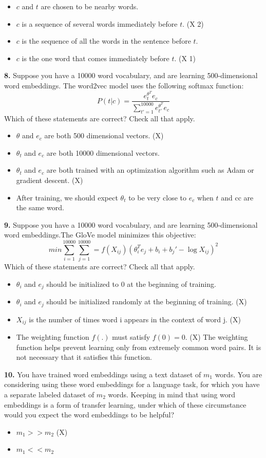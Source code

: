 \begin{itemize}
    \item $c$ and $t$ are chosen to be nearby words.
    \item $c$ is a sequence of several words immediately before $t$. (X 2)
    \item $c$ is the sequence of all the words in the sentence before $t$.
    \item $c$ is the one word that comes immediately before $t$. (X 1)
\end{itemize}
\textbf{8.} Suppose you have a 10000 word vocabulary, and are learning 500-dimensional word embeddings. The word2vec model uses the following softmax function:
\begin{equation*}
     P(t | c) = \frac{e^{\theta^T}_t e_c}{\sum^{10000}_{t'=1} e^{\theta^T}_{t'} e_c}
\end{equation*}
Which of these statements are correct? Check all that apply.
\begin{itemize}
    \item $\theta$ and $e_c$ are both 500 dimensional vectors. (X)
    \item $\theta_t$ and $e_c$ are both 10000 dimensional vectors.
    \item $\theta_t$ and $e_c$ are both trained with an optimization algorithm such as Adam or gradient descent. (X)
    \item After training, we should expect $\theta_t$ to be very close to $e_c$ when $t$ and cc are the same word.
\end{itemize}
\textbf{9.} Suppose you have a 10000 word vocabulary, and are learning 500-dimensional word embeddings.The GloVe model minimizes this objective:
\begin{equation*}
    min \sum^{10000}_{i=1} \sum^{10000}_{j=1} = f(X_{ij}) (\theta^{T}_{i} e_{j} + b_i + b_{j}' - \log X_{ij})^2
\end{equation*}
Which of these statements are correct? Check all that apply.
\begin{itemize}
    \item $\theta_i$ and $e_j$ should be initialized to 0 at the beginning of training.
    \item $\theta_i$ and $e_j$ should be initialized randomly at the beginning of training. (X)
    \item $X_{ij}$ is the number of times word i appears in the context of word j. (X)
    \item The weighting function $f(.)$ must satisfy $f(0) = 0$. (X) The weighting function helps prevent learning only from extremely common word pairs. It is not necessary that it satisfies this function.
\end{itemize}
\textbf{10.} You have trained word embeddings using a text dataset of $m_1$ words. You are considering using these word embeddings for a language task, for which you have a separate labeled dataset of $m_2$ words. Keeping in mind that using word embeddings is a form of transfer learning, under which of these circumstance would you expect the word embeddings to be helpful?
\begin{itemize}
    \item $m_1 >> m_2$ (X)
    \item $m_1 << m_2$
\end{itemize}